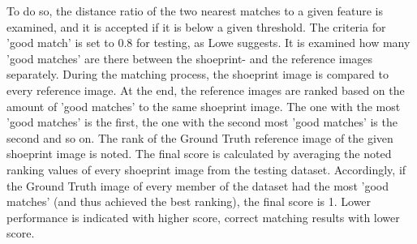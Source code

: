 \documentclass[draft,final]{vutinfth} %
\begin{document}
To do so, the distance ratio of the two nearest matches to a given feature is examined, and it is accepted if it is below a given threshold.
The criteria for 'good match' is set to 0.8 for testing, as Lowe  \cite{lowe2004distinctive} suggests.
It is examined how many 'good matches' are there between the shoeprint- and the reference images separately.
During the matching process, the shoeprint image is compared to every reference image.
At the end, the reference images are ranked based on the amount of 'good matches' to the same shoeprint image. 
The one with the most 'good matches' is the first, the one with the second most 'good matches' is the second and so on. 
The rank of the Ground Truth reference image of the given shoeprint image is noted.
The final score is calculated by averaging the noted ranking values of every shoeprint image from the testing dataset.
Accordingly, if the Ground Truth image of every member of the dataset had the most 'good matches' (and thus achieved the best ranking), the final score is 1. 
Lower performance is indicated with higher score, correct matching results with lower score.
\end{document}
